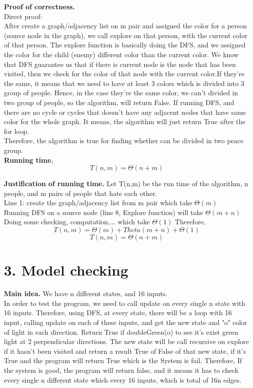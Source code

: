 \documentclass[11pt]{article}
\begin{document}
\noindent
\textbf{Proof of correctness.}\\
Direct proof:\\
After create a graph/adjacency list on m pair and assigned the color for a person (source node in the graph), we call explore on that person, with the current color of that person. The explore function is basically doing the DFS, and we assigned the color for the child (enemy) different color than the current color. We know that DFS guarantee us that if there is current node is the node that has been visited, then we check for the color of that node with the current color.If they're the same, it means that we need to have at least 3 colors which is divided into 3 group of people. Hence, in the case they're the same color, we can't divided in two group of people, so the algorithm, will return False. If running DFS, and there are no cycle or cycles that doesn't have any adjacent nodes that have same color for the whole graph. It means, the algorithm will just return True after the for loop.\\
Therefore, the algorithm is true for finding whether can be divided in two peace group.\\ 

\noindent
\textbf{Running time.}
$$\boxed{T(n,m) = \Theta(n+m)}$$


\noindent
\textbf{Justification of running time.}
Let T(n,m) be the run time of the algorithm, n people, and m pairs of people that hate each other.\\
Line 1: create the graph/adjacency list from m pair which take $\Theta(m)$\\
Running DFS on a source node (line 8, Explore function) will take $\Theta(m+n)$\\
Doing some checking, computation,... which take $\Theta(1)$
Therefore,
$$T(n,m) = \Theta(m) + Theta(m+n)+ \Theta(1)$$
$$\boxed{T(n,m) = \Theta(n+m)}$$



\newpage
\section*{3. Model checking}
\noindent
\textbf{Main idea.}
We have n different states, and 16 inputs.\\
In order to test the program, we need to call update on every single n state with 16 inputs. Therefore, using DFS, at every state, there will be a loop with 16 input, calling update on each of these inputs, and get the new state and "o" color of light in each direction. Return True if doubleGreen(o) to see it's exist green light at 2 perpendicular directions. The new state will be call recursive on explore if it hasn't been visited and return a result True of False of that new state, if it's True and the program will return True which is the System is fail. Therefore, If the system is good, the program will return false, and it means it has to check every single n different state which every 16 inputs, which is total of 16n edges.\\
\end{document}
